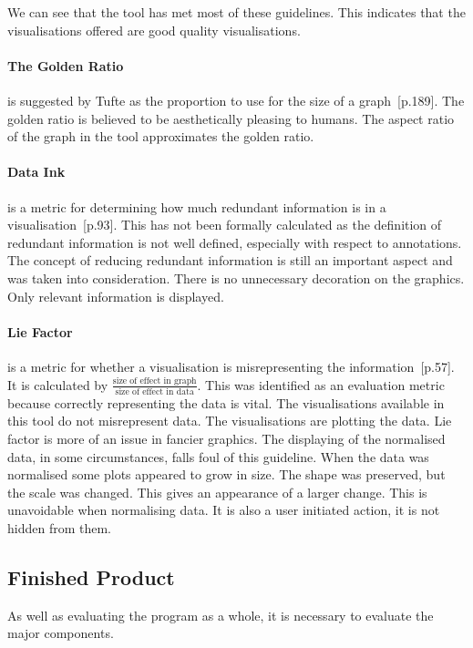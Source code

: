 We can see that the tool has met most of these guidelines.  This indicates that the visualisations offered are good quality visualisations.

\paragraph*{The Golden Ratio} is suggested by Tufte as the proportion to use for the size of a graph~\cite{tufte}[p.189].  The golden ratio is believed to be aesthetically pleasing to humans.  The aspect ratio of the graph in the tool approximates the golden ratio.

\paragraph*{Data Ink} is a metric for determining how much redundant information is in a visualisation~\cite{tufte}[p.93].  This has not been formally calculated as the definition of redundant information is not well defined, especially with respect to annotations.  The concept of reducing redundant information is still an important aspect and was taken into consideration.  There is no unnecessary decoration on the graphics.  Only relevant information is displayed.

\paragraph*{Lie Factor} is a metric for whether a visualisation is misrepresenting the information~\cite{tufte}[p.57].  It is calculated by $\frac{\text{size of effect in graph}}{\text{size of effect in data}}$.  This was identified as an evaluation metric because correctly representing the data is vital.  The visualisations available in this tool do not misrepresent data.  The visualisations are plotting the data.  Lie factor is more of an issue in fancier graphics.  The displaying of the normalised data, in some circumstances, falls foul of this guideline.  When the data was normalised some plots appeared to grow in size.  The shape was preserved, but the scale was changed.  This gives an appearance of a larger change.  This is unavoidable when normalising data.  It is also a user initiated action, it is not hidden from them.

\subsection{Finished Product}

As well as evaluating the program as a whole, it is necessary to evaluate the major components.

